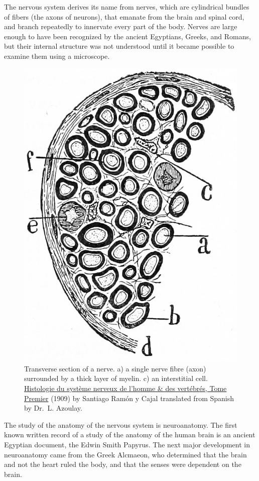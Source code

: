 The nervous system derives its name from nerves, which are cylindrical bundles of fibers (the axons of neurons), that emanate from the brain and spinal cord, and branch repeatedly to innervate every part of the body. Nerves are large enough to have been recognized by the ancient Egyptians, Greeks, and Romans, but their internal structure was not understood until it became possible to examine them using a microscope.



\begin{figure}

{\centering \includegraphics[width=0.7\linewidth]{./figures/nervoussystem/CajalNerve} 

}

\caption{Transverse section of a nerve. a) a single nerve fibre (axon) surrounded by a thick layer of myelin. c) an interstitial cell. \href{https://wellcomelibrary.org/item/b2129592x\#?c=0\&m=0\&s=0\&cv=14\&z=0\%2C-3.48\%2C1\%2C8.6591}{Histologie du système nerveux de l'homme \& des vertébrés, Tome Premier} (1909) by Santiago Ramón y Cajal translated from Spanish by Dr.~L. Azoulay.}\label{fig:nervesection}
\end{figure}

The study of the anatomy of the nervous system is neuroanatomy. The first known written record of a study of the anatomy of the human brain is an ancient Egyptian document, the Edwin Smith Papyrus. The next major development in neuroanatomy came from the Greek Alcmaeon, who determined that the brain and not the heart ruled the body, and that the senses were dependent on the brain.

